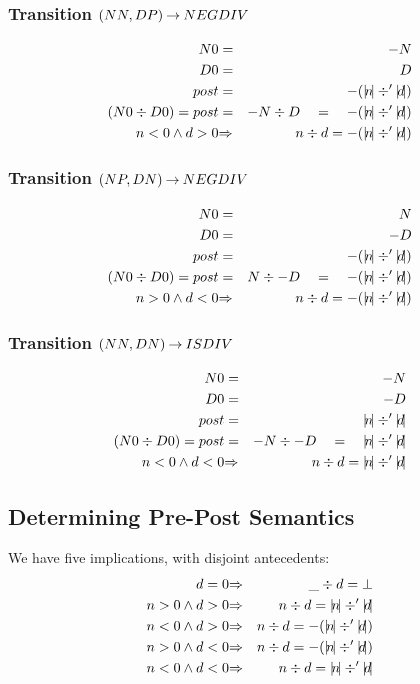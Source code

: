 \subsubsection{Transition $(NN,DP) \mathbin{\rightarrow} NEGDIV$}

\begin{eqnarray*}
   N0 &=& -N
\\ D0 &=& D
\\ post &=& -(\abs n \div' \abs d)
\\ (N0 \div D0)=post
   &=&
   -N \div D\quad=\quad-(\abs n \div' \abs d)
\\  n<0 \land  d>0 &\implies& n \div d = -(\abs n \div' \abs d)
\end{eqnarray*}


\subsubsection{Transition $(NP,DN) \mathbin{\rightarrow} NEGDIV$}

\begin{eqnarray*}
   N0 &=& N
\\ D0 &=& -D
\\ post &=& -(\abs n \div' \abs d)
\\ (N0 \div D0)=post
   &=&
   N \div -D\quad=\quad-(\abs n \div' \abs d)
\\  n>0 \land  d<0 &\implies& n \div d = -(\abs n \div' \abs d)
\end{eqnarray*}


\subsubsection{Transition $(NN,DN) \mathbin{\rightarrow} ISDIV$}

\begin{eqnarray*}
   N0 &=& -N
\\ D0 &=& -D
\\ post &=& \abs n \div' \abs d
\\ (N0 \div D0)=post
   &=&
   -N \div -D\quad=\quad\abs n \div' \abs d
\\  n<0 \land  d<0 &\implies& n \div d = \abs n \div' \abs d
\end{eqnarray*}

\subsection{Determining Pre-Post Semantics}

We have five implications, with disjoint antecedents:
\begin{eqnarray*}
               d=0 &\implies& \_ \div d  =  \bot
\\  n>0 \land  d>0 &\implies& n  \div d  =  \abs n \div' \abs d
\\  n<0 \land  d>0 &\implies& n  \div d  =  -(\abs n \div' \abs d)
\\  n>0 \land  d<0 &\implies& n  \div d  =  -(\abs n \div' \abs d)
\\  n<0 \land  d<0 &\implies& n  \div d  =  \abs n \div' \abs d
\end{eqnarray*}

